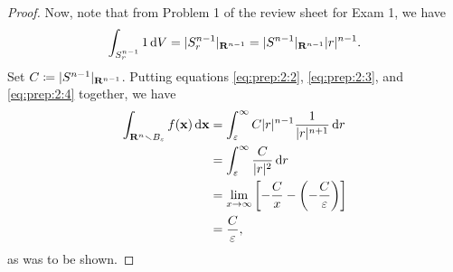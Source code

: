 \begin{proof}
Now, note that from Problem 1 of the review sheet for Exam 1, we have
\begin{equation}
  \label{eq:prep:2:4}
\int_{S_r^{n-1}}1\mathop{}\!\mathrm{d} V=|S_r^{n-1}|_{\mathbf{R}^{n-1}}=|S^{n-1}|_{\mathbf{R}^{n-1}}|r|^{n-1}.
\end{equation}
Set $C\coloneqq|S^{n-1}|_{\mathbf{R}^{n-1}}$. Putting equations
\eqref{eq:prep:2:2}, \eqref{eq:prep:2:3}, and \eqref{eq:prep:2:4} together,
we have
\begin{equation}
\label{eq:prep:2:5}
\begin{aligned}
\int_{\mathbf{R}^n\smallsetminus B_\varepsilon}f(\mathbf{x})\mathop{}\!\mathrm{d}\mathbf{x}
&=\int_\varepsilon^\infty C|r|^{n-1}\frac{1}{|r|^{n+1}}\mathop{}\!\mathrm{d} r\\
&=\int_\varepsilon^\infty\frac{C}{|r|^2}\mathop{}\!\mathrm{d} r\\
&=\lim_{x\to\infty}\left[-\frac{C}{x}-\left(-\frac{C}{\varepsilon}\right)\right]\\
&=\frac{C}{\varepsilon},
\end{aligned}
\end{equation}
as was to be shown.
\end{proof}

